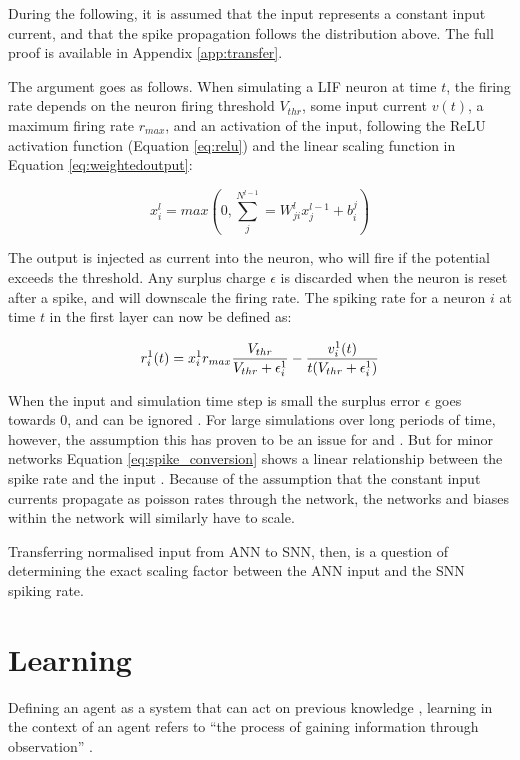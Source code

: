 \documentclass[report.tex]{subfiles}
\begin{document}
During the following, it is assumed that the input represents a constant
input current, and that the spike propagation follows the distribution
above.
The full proof is available in Appendix \ref{app:transfer}.

The argument goes as follows.
When simulating a LIF
neuron at time $t$, the firing rate depends on the neuron firing threshold $V_{thr}$,
some input current $v(t)$, a maximum
firing rate $r_{max}$, and an activation of the input, following the
ReLU activation function (Equation \ref{eq:relu}) and 
the linear scaling function in Equation \ref{eq:weightedoutput}:

\begin{equation}
x_i^l = max\left(0, \sum^{N^{l - 1}}_j= W^l_{ji} x_j^{l - 1} + b_i^j\right)
  \label{eq:relu_activation}
\end{equation}

The output is injected as current into the neuron, who will fire if the
potential exceeds the threshold.
Any surplus charge $\epsilon$ is discarded when the neuron is reset
after a spike, and will downscale the firing rate.
The spiking rate for a neuron $i$ at time $t$ in the first layer can
now be defined as:

\begin{equation}
r_i^1(t) = x_i^1 r_{max} {V_{thr} \over V_{thr} + \epsilon_i^1 } - {v_i^1(t) \over t (V_{thr} + \epsilon_i^1) }
\label{eq:spike_conversion}
\end{equation}

When the input and simulation time step is small the surplus
error $\epsilon$ goes towards 0, and can be ignored \cite{Rueckauer2017}.
For large simulations over long periods of time, however, the assumption
this has proven to be an issue for \citeauthor{Diehl2015} and
\citeauthor{Rueckauer2017}.
But for minor networks Equation \ref{eq:spike_conversion} shows a 
linear relationship between the spike rate and the input
\cite{Rueckauer2017}.
Because of the assumption that the constant input currents propagate as poisson rates
through the network, the networks and biases within the network will similarly
have to scale.

Transferring normalised input from \gls{ANN} to \gls{SNN}, then, is
a question of determining the exact scaling factor between the \gls{ANN} input
and the \gls{SNN} spiking rate.

\section{Learning}  \label{sec:learning}
Defining an \gls{agent} as a system that can act on previous knowledge
\cite{Russel2007}, learning in the context of an \gls{agent}
refers to ``the process of gaining
information through observation'' \cite{sep:learning-formal}.
\end{document}
